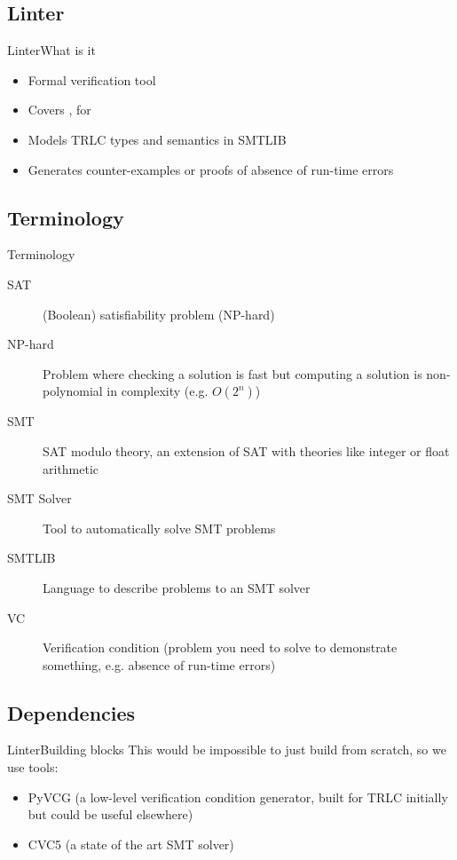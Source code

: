 \documentclass[aspectratio=169]{beamer}
\begin{document}
\subsection{Linter}
\begin{frame}{Linter}{What is it}
  \begin{itemize}
  \item Formal verification tool
  \item Covers , for 
  \item Models TRLC types and semantics in SMTLIB
  \item Generates counter-examples or proofs of absence of run-time
    errors
  \end{itemize}
\end{frame}

\subsection{Terminology}
\begin{frame}{Terminology}
  \begin{description}
  \item[SAT] (Boolean) satisfiability problem (NP-hard)
  \item[NP-hard] Problem where checking a solution is fast but
    computing a solution is non-polynomial in complexity
    (e.g. $O(2^n)$)
  \item[SMT] SAT modulo theory, an extension of SAT with theories like
    integer or float arithmetic
  \item[SMT Solver] Tool to automatically solve SMT problems
  \item[SMTLIB] Language to describe problems to an SMT solver
  \item[VC] Verification condition (problem you need to solve to
    demonstrate something, e.g. absence of run-time errors)
  \end{description}
\end{frame}

\subsection{Dependencies}
\begin{frame}{Linter}{Building blocks}
  This would be impossible to just build from scratch, so we use tools:
  \begin{itemize}
  \item PyVCG (a low-level verification condition generator, built for
    TRLC initially but could be useful elsewhere)
  \item CVC5 (a state of the art SMT solver)
  \end{itemize}
\end{frame}
\end{document}
